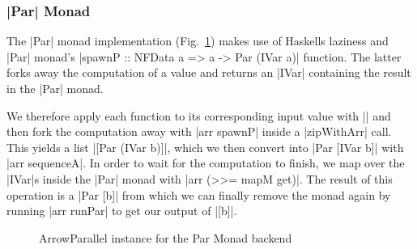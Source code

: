 \subsubsection{|Par| Monad}
The |Par| monad implementation (Fig.~\ref{fig:ArrowParallelParMonad}) makes use of Haskells laziness and |Par| monad's |spawnP :: NFData a => a -> Par (IVar a)| function. The latter forks away the computation of a value and returns an |IVar| containing the result in the |Par| monad.


We therefore apply each function to its corresponding input value with || and then fork the computation away with |arr spawnP| inside a |zipWithArr| call. This yields a list |[Par (IVar b)]|, which we then convert into |Par [IVar b]| with |arr sequenceA|. In order to wait for the computation to finish, we map over the |IVar|s inside the |Par| monad with |arr (>>= mapM get)|. The result of this operation is a |Par [b]| from which we can finally remove the monad again by running |arr runPar| to get our output of |[b]|.
\begin{figure}[h]
\caption{ArrowParallel instance for the Par Monad backend}
\label{fig:ArrowParallelParMonad}
\end{figure}

